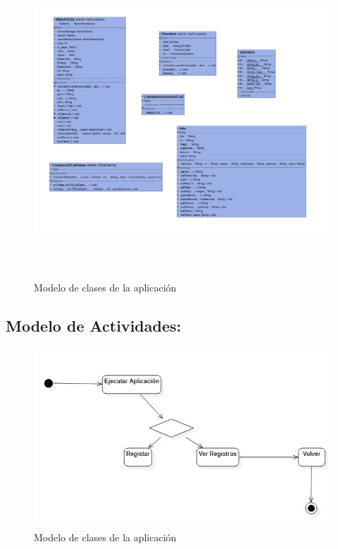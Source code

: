 \documentclass[conference,compsoc,onecolumn]{IEEEtran}
\begin{document}
 \begin{figure}[H]
\centering
\includegraphics[keepaspectratio, width=\textwidth, height= 338pt]{Imagenes/Imagen8.jpg}
\caption{Modelo de clases de la aplicación}
\end{figure}

\enskip

\subsection{Modelo de Actividades:}

 \begin{figure}[H]
\centering
\includegraphics[keepaspectratio, width=400pt ,height=190pt]{Imagenes/Imagen9.jpg}
\caption{Modelo de clases de la aplicación}
\end{figure}
\end{document}
